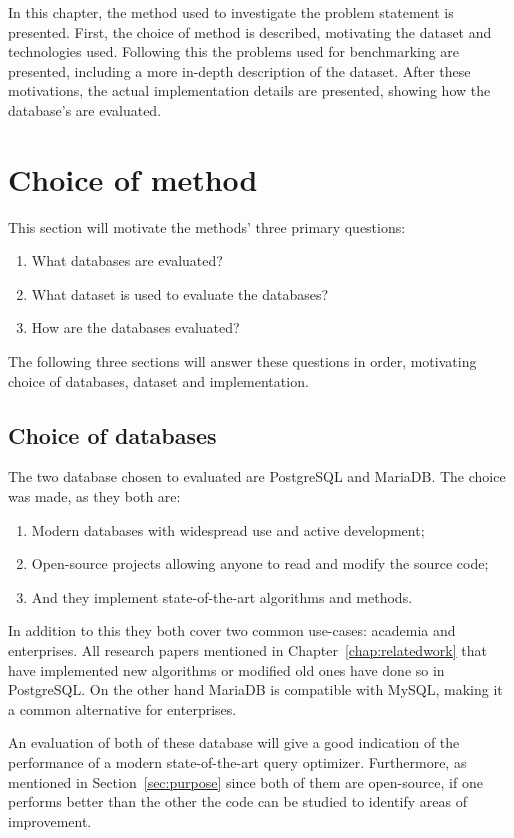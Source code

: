 In this chapter, the method used to investigate the problem statement is
presented. First, the choice of method is described, motivating the dataset and
technologies used. Following this the problems used for benchmarking are
presented, including a more in-depth description of the dataset. After these
motivations, the actual implementation details are presented, showing how the
database's are evaluated.

\section{Choice of method}\label{sec:choiceofmethod}
This section will motivate the methods' three primary questions:
\begin{enumerate}
\item What databases are evaluated?
\item What dataset is used to evaluate the databases?
\item How are the databases evaluated?
\end{enumerate}

The following three sections will answer these questions in order, motivating
choice of databases, dataset and implementation.

\subsection{Choice of databases}\label{sec:choiceofdatabases}
The two database chosen to evaluated are PostgreSQL and MariaDB. The choice was
made, as they both are:
\begin{enumerate}
\item Modern databases with widespread use and active development;
\item Open-source projects allowing anyone to read and modify the source code;
\item And they implement state-of-the-art algorithms and methods.
\end{enumerate}

In addition to this they both cover two common use-cases: academia and
enterprises. All research papers mentioned in Chapter~\ref{chap:relatedwork} that have
implemented new algorithms or modified old ones have done so in PostgreSQL.
On the other hand MariaDB is compatible with MySQL, making it a common
alternative for enterprises.

An evaluation of both of these database will give a good indication of the
performance of a modern state-of-the-art query optimizer. Furthermore, as
mentioned in Section~\ref{sec:purpose} since both of them are open-source, if
one performs better than the other the code can be studied to identify areas of
improvement.

